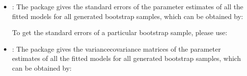 \documentclass[letterpaper,10pt,english]{sphinxmanual}
\begin{document}
\begin{itemize}
\item {} 
\sphinxAtStartPar
{}: The package gives the standard errors of the parameter estimates of all the fitted models for all generated
bootstrap samples, which can be obtained by:
\begin{quote}

\begin{sphinxVerbatim}[commandchars=\\\{\}]
            
  \PYG{p}{[}\PYG{p}{]}
\end{sphinxVerbatim}
\end{quote}

\sphinxAtStartPar
To get the standard errors of a particular bootstrap sample, please use:
\begin{quote}

\begin{sphinxVerbatim}[commandchars=\\\{\}]
\PYG{p}{[}\PYG{p}{]}\PYG{p}{[}\PYG{p}{]}
\end{sphinxVerbatim}
\end{quote}

\item {} 
\sphinxAtStartPar
{}: The package gives the variance\sphinxhyphen{}covariance matrices of the parameter estimates of all the fitted models for all generated
bootstrap samples, which can be obtained by:
\begin{quote}


\end{quote}
\end{itemize}
\end{document}
